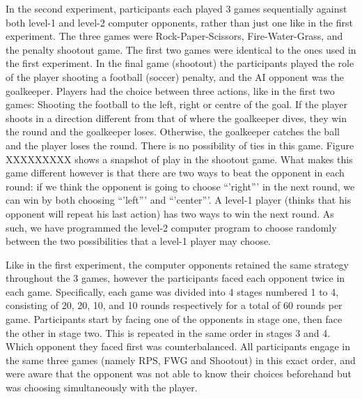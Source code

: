 \documentclass[,man,floatsintext]{apa6}
\begin{document}
In the second experiment, participants each played 3 games sequentially against both level-1 and level-2 computer opponents, rather than just one like in the first experiment. The three games were Rock-Paper-Scissors, Fire-Water-Grass, and the penalty shootout game. The first two games were identical to the ones used in the first experiment. In the final game (shootout) the participants played the role of the player shooting a football (soccer) penalty, and the AI opponent was the goalkeeper. Players had the choice between three actions, like in the first two games: Shooting the football to the left, right or centre of the goal. If the player shoots in a direction different from that of where the goalkeeper dives, they win the round and the goalkeeper loses. Otherwise, the goalkeeper catches the ball and the player loses the round. There is no possibility of ties in this game. Figure XXXXXXXXX shows a snapshot of play in the shootout game. What makes this game different however is that there are two ways to beat the opponent in each round: if we think the opponent is going to choose \enquote{'right}' in the next round, we can win by both choosing \enquote{'left}' and \enquote{'center}'. A level-1 player (thinks that his opponent will repeat his last action) has two ways to win the next round. As such, we have programmed the level-2 computer program to choose randomly between the two possibilities that a level-1 player may choose.

Like in the first experiment, the computer opponents retained the same strategy throughout the 3 games, however the participants faced each opponent twice in each game. Specifically, each game was divided into 4 stages numbered 1 to 4, consisting of 20, 20, 10, and 10 rounds respectively for a total of 60 rounds per game. Participants start by facing one of the opponents in stage one, then face the other in stage two. This is repeated in the same order in stages 3 and 4. Which opponent they faced first was counterbalanced. All participants engage in the same three games (namely RPS, FWG and Shootout) in this exact order, and were aware that the opponent was not able to know their choices beforehand but was choosing simultaneously with the player.
\end{document}
